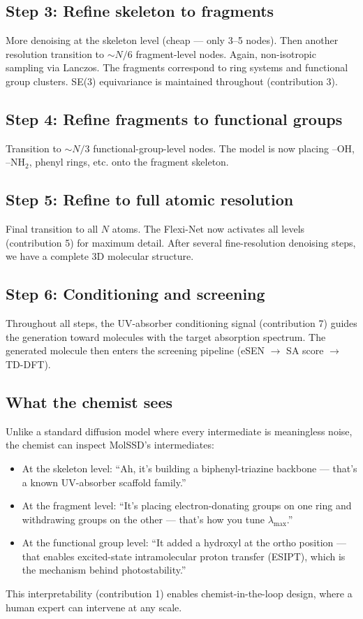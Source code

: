 \documentclass[12pt,a4paper]{article}
\begin{document}
\subsection{Step 3: Refine skeleton to fragments}

More denoising at the skeleton level (cheap --- only 3--5 nodes). Then another resolution transition to $\sim N/6$ fragment-level nodes. Again, non-isotropic sampling via Lanczos. The fragments correspond to ring systems and functional group clusters. SE(3) equivariance is maintained throughout (contribution 3).

\subsection{Step 4: Refine fragments to functional groups}

Transition to $\sim N/3$ functional-group-level nodes. The model is now placing --OH, --NH$_2$, phenyl rings, etc. onto the fragment skeleton.

\subsection{Step 5: Refine to full atomic resolution}

Final transition to all $N$ atoms. The Flexi-Net now activates all levels (contribution 5) for maximum detail. After several fine-resolution denoising steps, we have a complete 3D molecular structure.

\subsection{Step 6: Conditioning and screening}

Throughout all steps, the UV-absorber conditioning signal (contribution 7) guides the generation toward molecules with the target absorption spectrum. The generated molecule then enters the screening pipeline (eSEN $\to$ SA score $\to$ TD-DFT).

\subsection{What the chemist sees}

Unlike a standard diffusion model where every intermediate is meaningless noise, the chemist can inspect MolSSD's intermediates:
\begin{itemize}
  \item At the skeleton level: ``Ah, it's building a biphenyl-triazine backbone --- that's a known UV-absorber scaffold family.''
  \item At the fragment level: ``It's placing electron-donating groups on one ring and withdrawing groups on the other --- that's how you tune $\lambda_{\max}$.''
  \item At the functional group level: ``It added a hydroxyl at the ortho position --- that enables excited-state intramolecular proton transfer (ESIPT), which is the mechanism behind photostability.''
\end{itemize}
This interpretability (contribution 1) enables chemist-in-the-loop design, where a human expert can intervene at any scale.
\end{document}

